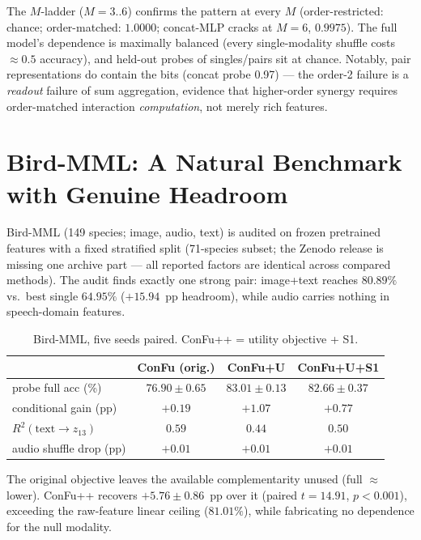 \documentclass[10pt,twocolumn]{article}
\begin{document}
The $M$-ladder ($M{=}3..6$) confirms the pattern at every $M$ (order-restricted: chance;
order-matched: $1.0000$; concat-MLP cracks at $M{=}6$, $0.9975$). The full model's dependence is
maximally balanced (every single-modality shuffle costs ${\approx}0.5$ accuracy), and
held-out probes of singles/pairs sit at chance. Notably, pair representations do contain the
bits (concat probe 0.97) --- the order-2 failure is a \emph{readout} failure of sum aggregation,
evidence that higher-order synergy requires order-matched interaction \emph{computation}, not
merely rich features.

\section{Bird-MML: A Natural Benchmark with Genuine Headroom}\label{sec:birdmml}
Bird-MML (149 species; image, audio, text) is audited on frozen pretrained features with a fixed
stratified split (71-species subset; the Zenodo release is missing one archive part --- all
reported factors are identical across compared methods). The audit finds exactly one strong pair:
image+text reaches $80.89\%$ vs.\ best single $64.95\%$ ($+15.94$~pp headroom), while audio
carries nothing in speech-domain features.

\begin{table}[h]\centering\small
\caption{Bird-MML, five seeds paired. ConFu++ = utility objective + S1.}
\begin{tabular}{lccc}
\toprule
 & ConFu (orig.) & ConFu+U & ConFu+U+S1 \\
\midrule
probe full acc (\%) & $76.90\pm0.65$ & $83.01\pm0.13$ & $82.66\pm0.37$ \\
conditional gain (pp) & $+0.19$ & $+1.07$ & $+0.77$ \\
$R^2(\mathrm{text}{\to}z_{13})$ & $0.59$ & $\mathbf{0.44}$ & $0.50$ \\
audio shuffle drop (pp) & $+0.01$ & $+0.01$ & $+0.01$ \\
\bottomrule
\end{tabular}
\end{table}

The original objective leaves the available complementarity unused (full ${\approx}$ lower).
ConFu++ recovers $+5.76{\pm}0.86$~pp over it (paired $t{=}14.91$, $p{<}0.001$), exceeding the
raw-feature linear ceiling ($81.01\%$), while fabricating no dependence for the null modality.
\end{document}
